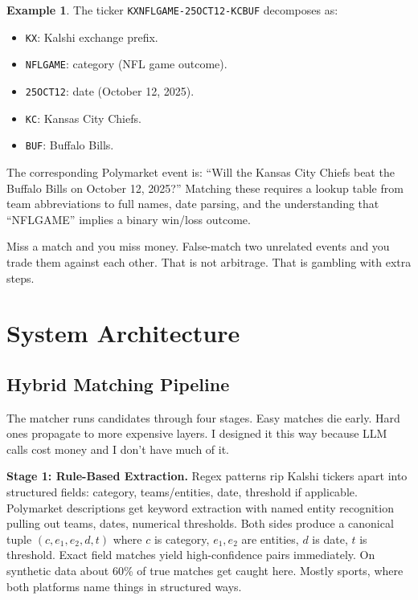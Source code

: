 \documentclass[11pt]{article}
\theoremstyle{definition}
\newtheorem{example}[theorem]{Example}
\theoremstyle{remark}
\begin{document}
\begin{example}
\label{ex:matching}
The ticker \texttt{KXNFLGAME-25OCT12-KCBUF} decomposes as:
\begin{itemize}
  \item \texttt{KX}: Kalshi exchange prefix.
  \item \texttt{NFLGAME}: category (NFL game outcome).
  \item \texttt{25OCT12}: date (October 12, 2025).
  \item \texttt{KC}: Kansas City Chiefs.
  \item \texttt{BUF}: Buffalo Bills.
\end{itemize}
The corresponding Polymarket event is: ``Will the Kansas City Chiefs beat the Buffalo Bills on October 12, 2025?'' Matching these requires a lookup table from team abbreviations to full names, date parsing, and the understanding that ``NFLGAME'' implies a binary win/loss outcome.
\end{example}

Miss a match and you miss money. False-match two unrelated events and you trade them against each other. That is not arbitrage. That is gambling with extra steps.

\section{System Architecture}
\label{sec:architecture}

\subsection{Hybrid Matching Pipeline}
\label{sec:pipeline}

The matcher runs candidates through four stages. Easy matches die early. Hard ones propagate to more expensive layers. I designed it this way because LLM calls cost money and I don't have much of it.

\textbf{Stage 1: Rule-Based Extraction.} Regex patterns rip Kalshi tickers apart into structured fields: category, teams/entities, date, threshold if applicable. Polymarket descriptions get keyword extraction with named entity recognition pulling out teams, dates, numerical thresholds. Both sides produce a canonical tuple $(c, e_1, e_2, d, t)$ where $c$ is category, $e_1, e_2$ are entities, $d$ is date, $t$ is threshold. Exact field matches yield high-confidence pairs immediately. On synthetic data about 60\% of true matches get caught here. Mostly sports, where both platforms name things in structured ways.
\end{document}
